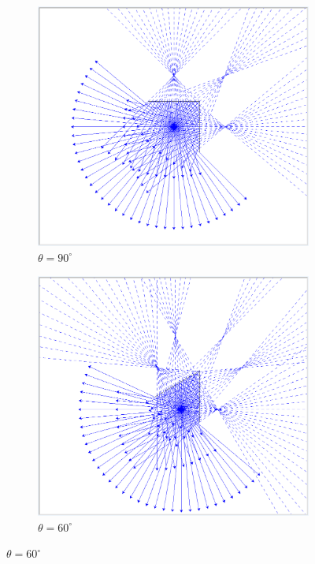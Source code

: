 \documentclass{zc-ust-hw}
\begin{document}
\begin{enumerate}
    \begin{figure}[htpb]
      \centering
      \begin{subfigure}{0.45\textwidth}
        \centering
        \includegraphics[width=\linewidth]{figures/90.png}
        \caption{$\theta=90^\circ$}
        \label{fig:sub1}
      \end{subfigure}
      \hfill
      \begin{subfigure}{0.45\textwidth}
        \centering
        \includegraphics[width=\linewidth]{figures/60.png}
        \caption{$\theta=60^\circ$}
        \label{fig:sub2}
      \end{subfigure}


\end{figure}
\end{enumerate}
\end{document}
